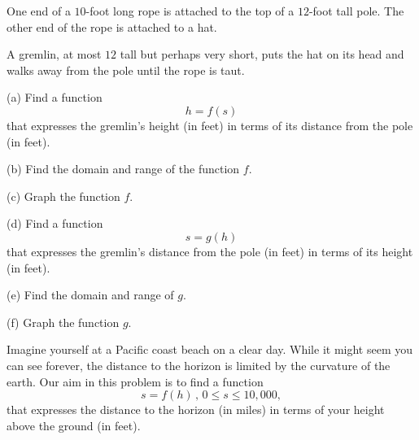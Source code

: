 \documentclass{ximera}
\begin{document}
\begin{question}  \label{Qdfsf4tnbnt}
One end of a $10$-foot long rope is attached to the top of a $12$-foot tall pole. The other end of the rope is attached to a hat.

A gremlin, at most $12$ tall but perhaps very short, puts the hat on its head and walks away from the pole until the rope is taut.

(a) Find a function
\[
      h = f(s)
\]
that expresses the gremlin's height (in feet) in terms of its distance from the pole (in feet).

(b) Find the domain and range of the function $f$.

(c) Graph the function $f$. 

(d) Find a function
\[
     s = g(h)
\]
that expresses the gremlin's distance from the pole (in feet)  in terms of its height (in feet).

(e) Find the domain and range of $g$.

(f) Graph the function $g$.

\end{question}


\begin{question}  \label{Qdfthhrhghgr}
Imagine yourself at a Pacific coast beach on a clear day. While it might seem you can see forever, the distance to the horizon is limited by the curvature of the earth. Our aim in this problem is to find a function 
\[
        s= f(h) \, , \, 0\leq s \leq 10,000 ,
\]
that expresses the distance to the horizon (in miles) in terms of your height above the ground (in feet).
\end{question}
\end{document}
